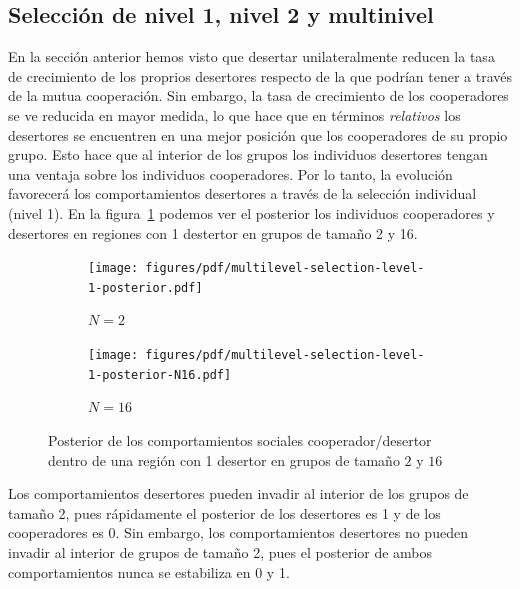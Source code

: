 \documentclass[a4paper,10pt]{article}
\begin{document}
\subsection{Selección de nivel 1, nivel 2 y multinivel}

En la sección anterior hemos visto que desertar unilateralmente reducen la tasa de crecimiento de los proprios desertores respecto de la que podrían tener a través de la mutua cooperación.
%
Sin embargo, la tasa de crecimiento de los cooperadores se ve reducida en mayor medida, lo que hace que en términos \emph{relativos} los desertores se encuentren en una mejor posición que los cooperadores de su propio grupo.
%
Esto hace que al interior de los grupos los individuos desertores tengan una ventaja sobre los individuos cooperadores.
%
Por lo tanto, la evolución favorecerá los comportamientos desertores a través de la selección individual (nivel 1).
%
En la figura~\ref{fig:multilevel-selection-level-1-posterior} podemos ver el posterior los individuos cooperadores y desertores en regiones con 1 destertor en grupos de tamaño 2 y 16.
%
\begin{figure}[H]
    \centering
    \begin{subfigure}[b]{0.48\textwidth}
    \texttt{[image: figures/pdf/multilevel-selection-level-1-posterior.pdf]}
    \caption{$N=2$}
    \end{subfigure}
    \begin{subfigure}[b]{0.48\textwidth}
    \texttt{[image: figures/pdf/multilevel-selection-level-1-posterior-N16.pdf]}
    \caption{$N=16$}
    \end{subfigure}
    \caption{
    Posterior de los comportamientos sociales cooperador/desertor dentro de una región con 1 desertor en grupos de tamaño $2$ y $16$
    }
    \label{fig:multilevel-selection-level-1-posterior}
\end{figure}
%
Los comportamientos desertores pueden invadir al interior de los grupos de tamaño 2, pues rápidamente el posterior de los desertores es 1 y de los cooperadores es 0.
%
Sin embargo, los comportamientos desertores no pueden invadir al interior de grupos de tamaño 2, pues el posterior de ambos comportamientos nunca se estabiliza en 0 y 1.

\end{document}
